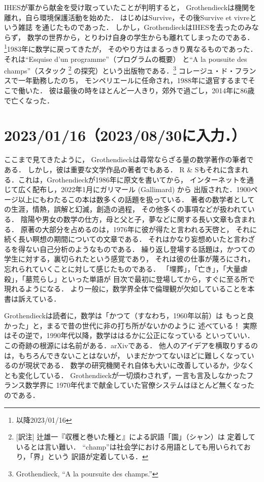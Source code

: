 \documentclass[11pt, a4paper, dvipdfmx]{jlreq}
\theoremstyle{definition}
\theoremstyle{mystyle}
\numberwithin{equation}{section} %
\begin{document}
IHESが軍から献金を受け取っていたことが判明すると，
Grothendieckは機関を離れ，自ら環境保護活動を始めた．
はじめはSurvive，その後Survive et vivreという雑誌
を通じたものであった．
しかし，GrothendieckはIHESを去ったのみならず，
数学の世界から，とりわけ自身の学生からも離れてしまったのである．
\footnote{以降2023/01/16}1983年に数学に戻ってきたが，
そのやり方はまるっきり異なるものであった．
それは``Esquise d'un programme''（プログラムの概要）
と``A la pousuite des champs''（スタック
\footnote{[訳注]
    辻雄一『収穫と巻いた種と』による訳語「園」（シャン）は
    定着しているとは言い難い．
    ``champ''は社会学における用語としても用いられており，「界」という
    訳語が定着している．}
の探究）という出版物である．\footnote[17]{
    Grothendieck, ``A la poursuite des champs.''
}
コレージュ・ド・フランスで一年勤務したのち，
モンペリエールに任命され，1988年に退官するまでそこで働いた．
彼は最後の時をほとんど一人きり，郊外で過ごし，2014年に86歳で亡くなった．

\section*{2023/01/16（2023/08/30に入力．）}

ここまで見てきたように，
Grothendieckは尋常ならざる量の数学著作の筆者である．
しかし，彼は重要な文学作品の著者でもある．
R \& Sもそれに含まれる．これは，Grothendieckが1986年に原文を書いてから，
インターネットを通じて広く配布し，2022年1月にガリマール (Gallimard) から
出版された．1900ページ以上にもわたるこの本は数多くの話題を扱っている．
著者の数学者としての生涯，情熱，誤解と幻滅，創造の過程，
その他多くの事項などが扱われている．
陰陽や男女の数学の仕方，母と父と子，夢などに関する長い文章も含まれる．
原著の大部分を占めるのは，1976年に彼が得たと言われる天啓と，
それに続く長い瞑想の期間についての文章である．
それはかなり妄想めいたと言わざるを得ない自己分析のようなものである．
繰り返し登場する話題は，かつての学生に対する，裏切られたという感覚であり，
それは彼の仕事が蔑ろにされ，忘れられていくことに対して感じたものである．
「埋葬」，「亡き」，「大量虐殺」，「墓荒らし」といった単語が
目次で最初に登場してから，すぐに至る所で現れるようになる．
より一般に，数学界全体で倫理観が欠如していることを本書は訴えている．

Grothendieckは読者に，数学は「かつて（すなわち，1960年以前）は
もっと良かった」と，まるで昔の世代に非の打ち所がないかのように
述べている！
実際はその逆で，1990年代以降，数学ははるかに公正になっている
といっていい．この奇跡の根源には名前がある．arXivである．
他人のアイデアを横取りするのは，もちろんできないことはないが，
いまだかつてないほどに難しくなっているのが現状である．
数学の研究機関それ自体も大いに改善しているか，少なくとも変化している．
Grothendieckが一切煩わされず，一言も言及しなかったフランス数学界に
1970年代まで献金していた官僚システムはほとんど無くなったのである．
\end{document}
